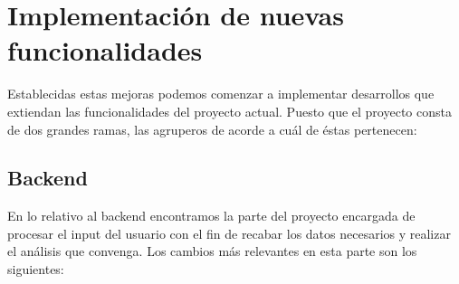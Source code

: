 \documentclass[a4paper, 12pt]{book}
\begin{document}
\section{Implementación de nuevas funcionalidades}

Establecidas estas mejoras podemos comenzar a implementar desarrollos que extiendan las funcionalidades del proyecto actual. Puesto que el proyecto consta de dos grandes ramas, las agruperos de acorde a cuál de éstas pertenecen:

\subsection{Backend}

En lo relativo al backend encontramos la parte del proyecto encargada de procesar el input del usuario con el fin de recabar los datos necesarios y realizar el análisis que convenga. Los cambios más relevantes en esta parte son los siguientes:
\end{document}

